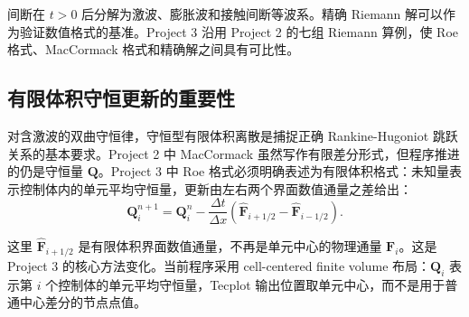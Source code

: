间断在 \(t>0\) 后分解为激波、膨胀波和接触间断等波系。精确 Riemann 解可以作为验证数值格式的基准。Project 3 沿用 Project 2 的七组 Riemann 算例，使 Roe 格式、MacCormack 格式和精确解之间具有可比性。

\subsection{有限体积守恒更新的重要性}

对含激波的双曲守恒律，守恒型有限体积离散是捕捉正确 Rankine-Hugoniot 跳跃关系的基本要求。Project 2 中 MacCormack 虽然写作有限差分形式，但程序推进的仍是守恒量 \(\bm Q\)。Project 3 中 Roe 格式必须明确表述为有限体积格式：未知量表示控制体内的单元平均守恒量，更新由左右两个界面数值通量之差给出：
\begin{equation}
    \bm Q_i^{n+1}
    =
    \bm Q_i^n
    -
    \frac{\Delta t}{\Delta x}
    \left(
        \hat{\bm F}_{i+1/2}
        -
        \hat{\bm F}_{i-1/2}
    \right).
\end{equation}

这里 \(\hat{\bm F}_{i+1/2}\) 是有限体积界面数值通量，不再是单元中心的物理通量 \(\bm F_i\)。这是 Project 3 的核心方法变化。当前程序采用 cell-centered finite volume 布局：\(\bm Q_i\) 表示第 \(i\) 个控制体的单元平均守恒量，Tecplot 输出位置取单元中心，而不是用于普通中心差分的节点点值。
